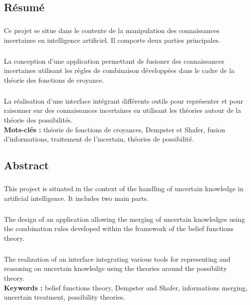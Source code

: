 \documentclass[a4paper, 12pt]{report}
\begin{document}
\begin{center}
\vspace*{4em}
\section*{Résumé}
\end{center}
\thispagestyle{empty}
\subparagraph{}
Ce projet se situe dans le contexte de la manipulation des connaissances incertaines en intelligence artificiel. Il comporte
deux parties principales.
\subparagraph{}
La conception d'une application permettant de fusioner des connaissances incertaines utilisant les règles de combinaison développées dans le cadre de la théorie des fonctions de croyance.
\subparagraph{}
La réalisation d'une interface intégrant différents outils pour représenter et pour raisonner sur des connaissances
incertaines en utilisant les théories autour de la théorie des possibilités.\\[2em]
  
\textbf{ Mots-clés :} théorie de fonctions de croyances, Dempster et Shafer, fusion d'informations, traitement de l'incertain,
théories de possibilité.
\begin{center}
\vspace{2em}
\section*{Abstract}
\end{center}
\subparagraph{}
This project is situated in the context of the handling of uncertain knowledge in artificial intelligence. It includes
two main parts.
\subparagraph{}
The design of an application allowing the merging of uncertain knowledges using the combination rules developed within the
framework of the belief functions theory.
\subparagraph{}
The realization of an interface integrating various tools for representing and reasoning on uncertain knowledge using the
theories around the possibility theory.\\[2em]

\textbf{Keywords :} belief functions theory, Dempster and Shafer, informations merging, uncertain treatment, possibility
theories.
\end{document}

